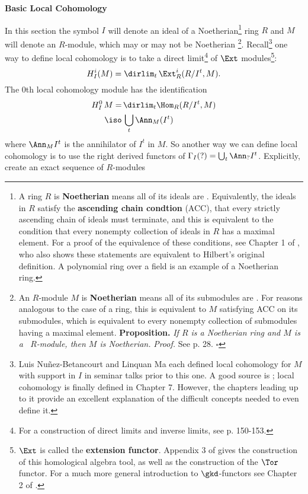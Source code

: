 \bigskip
\centerline{\bf Basic Local Cohomology}   
\bigskip

In this section the symbol $I$ will denote an ideal of a Noetherian\footnote{A ring $R$ is {\bf Noetherian} means all of its ideals are \fg.  Equivalently, the ideals in $R$ satisfy the {\bf ascending chain condtion} (ACC), that every strictly ascending chain of ideals must terminate, and this is equivalent to the condition that every nonempty collection of ideals in $R$ has a maximal element.  For a proof of the equivalence of these conditions, see Chapter 1 of \cite{Eis}, who also shows these statements are equivalent to Hilbert's original definition.  A polynomial ring over a field is an example of a Noetherian ring.} ring $R$ and $M$ will denote an $R$-module, which may or may not be Noetherian
\footnote{An $R$-module $M$ is {\bf Noetherian} means all of its submodules are \fg.  For reasons analogous to the case of a ring, this is equivalent to $M$ satisfying ACC on its submodules, which is equivalent to every nonempty collection of submodules having a maximal element.\newline
{\bf Proposition.} {\it If $R$ is a Noetherian ring and $M$ is a \fg\ $R$-module, then $M$ is Noetherian.} \newline
{\it Proof.} See \cite{Eis} p. 28. $\square$}.
Recall\footnote{Luis Nu\~nez-Betancourt and Linquan Ma each defined local cohomology for $M$ with support in $I$ in seminar talks prior to this one.  A good source is \cite{Iyen}; local cohomology is finally defined in Chapter 7.  However, the chapters leading up to it provide an excellent explanation of the difficult concepts needed to even define it.} one way to define local cohomology is to take a direct limit\footnote{For a construction of direct limits and inverse limits, see \cite{Hoch} p. 150-153.} of $\Ext$ modules\footnote{$\Ext$ is called the {\bf extension functor}.  Appendix 3 of \cite{Eis} gives the construction of this homological algebra tool, as well as the construction of the $\Tor$ functor.  For a much more general introduction to $\gkd$-functors see Chapter 2 of \cite{Weib}.}:
$$H^i_I(M)=\dirlim_t\,\Ext^i_R(R/I^t,M).$$
The 0th local cohomology module has the identification
$$\aligned H^0_I\,M=\,& \dirlim_t\Hom_R(R/I^t,M) \\
\iso\,& \bigcup_t\Ann_M(I^t) 
\endaligned$$
\flushpar where $\Ann_MI^t$ is the annihilator of $I^t$ in $M$.  So another way we can define local cohomology is to use the right derived functors of $\Gamma_I(?)=\bigcup_t\Ann_?I^t$.  Explicitly, create an exact sequence of $R$-modules
